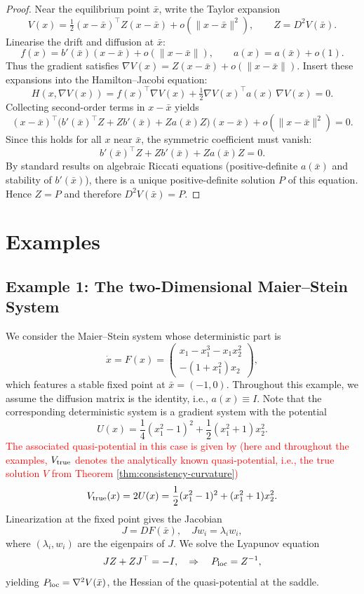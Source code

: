 \documentclass[11pt]{article}
\theoremstyle{plain}      %
\theoremstyle{definition} %
\begin{document}
\begin{proof}
Near the equilibrium point $\bar{x}$, write the Taylor expansion
\[
V(x)=\tfrac{1}{2}(x-\bar{x})^\top Z(x-\bar{x})
+o\!\left(\|x-\bar{x}\|^{2}\right),
\qquad Z=D^{2}V(\bar{x}).
\]
Linearise the drift and diffusion at $\bar{x}$:
\[
f(x)=b'(\bar{x})(x-\bar{x})+o(\|x-\bar{x}\|),\qquad
a(x)=a(\bar{x})+o(1).
\]
Thus the gradient satisfies $\nabla V(x)=Z(x-\bar{x})+o(\|x-\bar{x}\|)$.
Insert these expansions into the Hamilton–Jacobi equation:
\[
H(x,\nabla V(x))=
f(x)^\top\nabla V(x)
+\tfrac{1}{2}\nabla V(x)^\top a(x)\,\nabla V(x)=0.
\]
Collecting second-order terms in $x-\bar{x}$ yields
\[
(x-\bar{x})^\top\!
\bigl(b'(\bar{x})^\top Z + Z b'(\bar{x})
+Z a(\bar{x})Z\bigr)(x-\bar{x})
+o\!\left(\|x-\bar{x}\|^{2}\right)=0.
\]
Since this holds for all $x$ near $\bar{x}$, the symmetric coefficient must vanish:
\[
b'(\bar{x})^\top Z + Z b'(\bar{x}) + Z a(\bar{x})Z =0.
\]
By standard results on algebraic Riccati equations (positive-definite $a(\bar{x})$ and stability of $b'(\bar{x})$), there is a unique positive-definite solution $P$ of this equation.
Hence $Z=P$ and therefore $D^{2}V(\bar{x})=P$.
\end{proof}



\section{Examples}
\label{examples}

\subsection{Example 1: The two-Dimensional Maier--Stein System}\label{sec:example1}

We consider the Maier--Stein system whose deterministic part is
\[
\dot x = F(x) =
\begin{pmatrix}
x_1 - x_1^3 - x_1 x_2^2 \\[6pt]
-(1 + x_1^2) x_2
\end{pmatrix},
\]
which features a stable fixed point at \( \bar{x} = (-1,0) \). Throughout this example, we assume the diffusion matrix is the identity, i.e., $a(x) \equiv I$. Note that the corresponding deterministic system is a gradient system with the potential
\[
U(x) = \frac{1}{4} (x_1^2 - 1)^2 + \frac{1}{2} (x_1^2 + 1)x_2^2.
\]
\textcolor{red}{The associated quasi-potential in this case is given by (here and throughout the examples, $V_{\rm true}$ denotes the analytically known quasi-potential, i.e., the true solution $V$ from Theorem \ref{thm:consistency-curvature})}
\[
V_{\rm true}(x) = 2U(x) = \frac{1}{2} (x_1^2 - 1)^2 + (x_1^2 + 1)x_2^2.
\]
Linearization at the fixed point gives the Jacobian
\[
J = D F(\bar{x}), \quad J w_i = \lambda_i w_i,
\]
where \( (\lambda_i, w_i) \) are the eigenpairs of \( J \). We solve the Lyapunov equation
\[
J Z + Z J^\top = -I, \quad \Rightarrow \quad P_{\rm loc} = Z^{-1},
\]
yielding \( P_{\rm loc} = \nabla^2 V(\bar{x}) \), the Hessian of the quasi-potential at the saddle.
\end{document}

